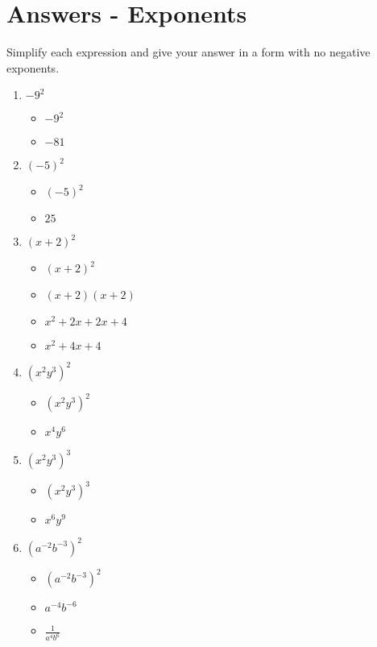 \section{Answers - Exponents}
Simplify each expression and give your answer in a form with no negative exponents.
\begin{enumerate}
\item $-9^{2}$
  \begin{itemize}
  \item $-9^{2}$
  \item $-81$
  \end{itemize}
\item $(-5)^{2}$
  \begin{itemize}
  \item $(-5)^{2}$
  \item $25$
  \end{itemize}
\item $(x+2)^{2}$
  \begin{itemize}
  \item $(x+2)^{2}$
  \item $(x+2)(x+2)$
  \item $x^{2}+2x+2x+4$
  \item $x^{2}+4x+4$
  \end{itemize}
\item $(x^{2}y^{3})^{2}$
  \begin{itemize}
  \item $(x^{2}y^{3})^{2}$
  \item $x^{4}y^{6}$
  \end{itemize}
\item $(x^{2}y^{3})^{3}$
  \begin{itemize}
  \item $(x^{2}y^{3})^{3}$
  \item $x^{6}y^{9}$
  \end{itemize}
\item $(a^{-2}b^{-3})^{2}$
  \begin{itemize}
  \item $(a^{-2}b^{-3})^{2}$
  \item $a^{-4}b^{-6}$
  \item {\Large $\frac{1}{a^{4}b^{6}}$}
  \end{itemize}

\end{enumerate}
